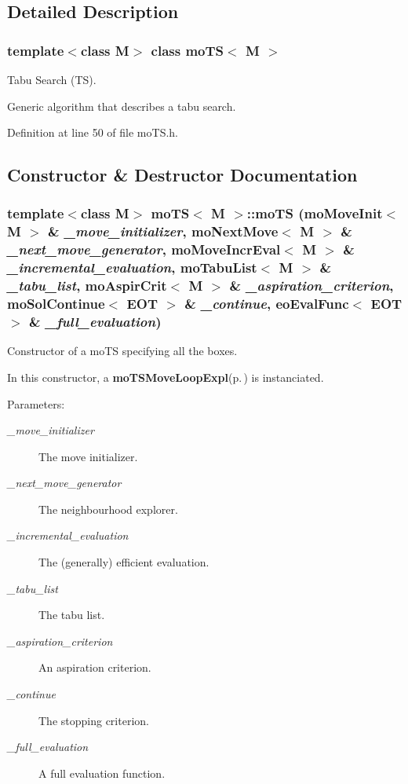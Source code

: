 \subsection{Detailed Description}
\subsubsection*{template$<$class M$>$ class mo\-TS$<$ M $>$}

Tabu Search (TS). 

Generic algorithm that describes a tabu search. 



Definition at line 50 of file mo\-TS.h.

\subsection{Constructor \& Destructor Documentation}
\subsubsection{\setlength{\rightskip}{0pt plus 5cm}template$<$class M$>$ {\bf mo\-TS}$<$ M $>$::{\bf mo\-TS} ({\bf mo\-Move\-Init}$<$ M $>$ \& {\em \_\-move\_\-initializer}, {\bf mo\-Next\-Move}$<$ M $>$ \& {\em \_\-next\_\-move\_\-generator}, {\bf mo\-Move\-Incr\-Eval}$<$ M $>$ \& {\em \_\-incremental\_\-evaluation}, {\bf mo\-Tabu\-List}$<$ M $>$ \& {\em \_\-tabu\_\-list}, {\bf mo\-Aspir\-Crit}$<$ M $>$ \& {\em \_\-aspiration\_\-criterion}, {\bf mo\-Sol\-Continue}$<$ {\bf EOT} $>$ \& {\em \_\-continue}, {\bf eo\-Eval\-Func}$<$ {\bf EOT} $>$ \& {\em \_\-full\_\-evaluation})\hspace{0.3cm}{\tt  [inline]}}\label{classmo_t_s_a0}


Constructor of a mo\-TS specifying all the boxes. 

In this constructor, a {\bf mo\-TSMove\-Loop\-Expl}{\rm (p.\,\pageref{classmo_t_s_move_loop_expl})} is instanciated.

\begin{Desc}
\item[Parameters:]
\begin{description}
\item[{\em \_\-move\_\-initializer}]The move initializer. \item[{\em \_\-next\_\-move\_\-generator}]The neighbourhood explorer. \item[{\em \_\-incremental\_\-evaluation}]The (generally) efficient evaluation. \item[{\em \_\-tabu\_\-list}]The tabu list. \item[{\em \_\-aspiration\_\-criterion}]An aspiration criterion. \item[{\em \_\-continue}]The stopping criterion. \item[{\em \_\-full\_\-evaluation}]A full evaluation function. \end{description}
\end{Desc}


